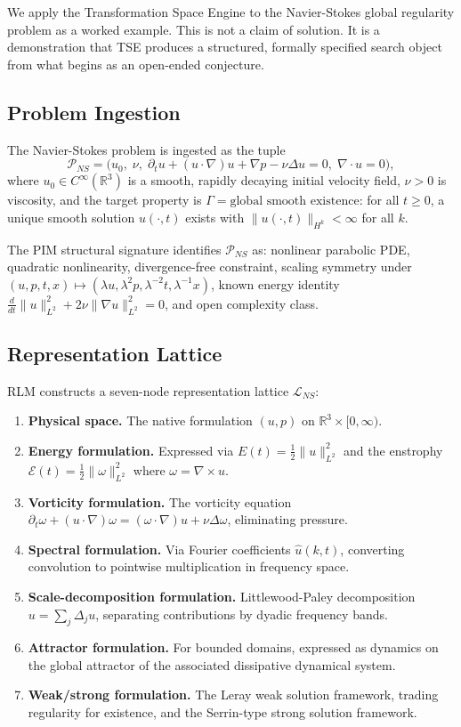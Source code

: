 We apply the Transformation Space Engine to the Navier-Stokes global regularity problem as a worked example. This is not a claim of solution. It is a demonstration that TSE produces a structured, formally specified search object from what begins as an open-ended conjecture.

\subsection{Problem Ingestion}

The Navier-Stokes problem is ingested as the tuple
\[
\mathcal{P}_{NS} = \bigl(u_0,\; \nu,\; \partial_t u + (u\cdot\nabla)u + \nabla p - \nu\Delta u = 0,\; \nabla\cdot u = 0\bigr),
\]
where $u_0 \in C^\infty(\mathbb{R}^3)$ is a smooth, rapidly decaying initial velocity field, $\nu > 0$ is viscosity, and the target property is $\Gamma = \text{global smooth existence}$: for all $t \geq 0$, a unique smooth solution $u(\cdot, t)$ exists with $\|u(\cdot,t)\|_{H^k} < \infty$ for all $k$.

The PIM structural signature identifies $\mathcal{P}_{NS}$ as: nonlinear parabolic PDE, quadratic nonlinearity, divergence-free constraint, scaling symmetry under $(u, p, t, x) \mapsto (\lambda u, \lambda^2 p, \lambda^{-2} t, \lambda^{-1} x)$, known energy identity $\frac{d}{dt}\|u\|_{L^2}^2 + 2\nu\|\nabla u\|_{L^2}^2 = 0$, and open complexity class.

\subsection{Representation Lattice}

RLM constructs a seven-node representation lattice $\mathcal{L}_{NS}$:

\begin{enumerate}
\item \textbf{Physical space.} The native formulation $(u, p)$ on $\mathbb{R}^3 \times [0,\infty)$.
\item \textbf{Energy formulation.} Expressed via $E(t) = \frac{1}{2}\|u\|_{L^2}^2$ and the enstrophy $\mathcal{E}(t) = \frac{1}{2}\|\omega\|_{L^2}^2$ where $\omega = \nabla \times u$.
\item \textbf{Vorticity formulation.} The vorticity equation $\partial_t \omega + (u\cdot\nabla)\omega = (\omega\cdot\nabla)u + \nu\Delta\omega$, eliminating pressure.
\item \textbf{Spectral formulation.} Via Fourier coefficients $\hat{u}(k,t)$, converting convolution to pointwise multiplication in frequency space.
\item \textbf{Scale-decomposition formulation.} Littlewood-Paley decomposition $u = \sum_j \Delta_j u$, separating contributions by dyadic frequency bands.
\item \textbf{Attractor formulation.} For bounded domains, expressed as dynamics on the global attractor of the associated dissipative dynamical system.
\item \textbf{Weak/strong formulation.} The Leray weak solution framework, trading regularity for existence, and the Serrin-type strong solution framework.
\end{enumerate}

